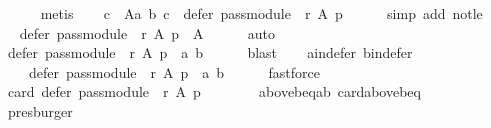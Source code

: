 \begin{isabellebody}
\ \ \ \ \isamarkupfalse%
\ metis\isanewline
\ \ \isamarkupfalse%
\ {\isachardoublequoteopen}{\isasymforall}c\ {\isasymin}\ A{\isacharminus}{\kern0pt}{\isacharbraceleft}{\kern0pt}a{\isacharcomma}{\kern0pt}\ b{\isacharbraceright}{\kern0pt}{\isachardot}{\kern0pt}\ c\ {\isasymnotin}\ defer\ {\isacharparenleft}{\kern0pt}pass{\isacharunderscore}{\kern0pt}module\ {}\ r{\isacharparenright}{\kern0pt}\ A\ p{\isachardoublequoteclose}\isanewline
\ \ \ \ \isamarkupfalse%
\ {\isacharparenleft}{\kern0pt}simp\ add{\isacharcolon}{\kern0pt}\ not{\isacharunderscore}{\kern0pt}le{\isacharparenright}{\kern0pt}\isanewline
\ \ \isamarkupfalse%
\ \isamarkupfalse%
\ {\isachardoublequoteopen}defer\ {\isacharparenleft}{\kern0pt}pass{\isacharunderscore}{\kern0pt}module\ {}\ r{\isacharparenright}{\kern0pt}\ A\ p\ {\isasymsubseteq}\ A{\isachardoublequoteclose}\isanewline
\ \ \ \ \isamarkupfalse%
\ auto\isanewline
\ \ \isamarkupfalse%
\ \isamarkupfalse%
\ {\isachardoublequoteopen}defer\ {\isacharparenleft}{\kern0pt}pass{\isacharunderscore}{\kern0pt}module\ {}\ r{\isacharparenright}{\kern0pt}\ A\ p\ {\isasymsubseteq}\ {\isacharbraceleft}{\kern0pt}a{\isacharcomma}{\kern0pt}\ b{\isacharbraceright}{\kern0pt}{\isachardoublequoteclose}\isanewline
\ \ \ \ \isamarkupfalse%
\ blast\isanewline
\ \ \isamarkupfalse%
\ a{\isacharunderscore}{\kern0pt}in{\isacharunderscore}{\kern0pt}defer\ b{\isacharunderscore}{\kern0pt}in{\isacharunderscore}{\kern0pt}defer\ \isamarkupfalse%
\isanewline
\ \ \ \ {\isachardoublequoteopen}defer\ {\isacharparenleft}{\kern0pt}pass{\isacharunderscore}{\kern0pt}module\ {}\ r{\isacharparenright}{\kern0pt}\ A\ p\ {\isacharequal}{\kern0pt}\ {\isacharbraceleft}{\kern0pt}a{\isacharcomma}{\kern0pt}\ b{\isacharbraceright}{\kern0pt}{\isachardoublequoteclose}\isanewline
\ \ \ \ \isamarkupfalse%
\ fastforce\isanewline
\ \ \isamarkupfalse%
\ {\isachardoublequoteopen}card\ {\isacharparenleft}{\kern0pt}defer\ {\isacharparenleft}{\kern0pt}pass{\isacharunderscore}{\kern0pt}module\ {}\ r{\isacharparenright}{\kern0pt}\ A\ p{\isacharparenright}{\kern0pt}\ {\isacharequal}{\kern0pt}\ {}{\isachardoublequoteclose}\isanewline
\ \ \ \ \isamarkupfalse%
\ above{\isacharunderscore}{\kern0pt}b{\isacharunderscore}{\kern0pt}eq{\isacharunderscore}{\kern0pt}ab\ card{\isacharunderscore}{\kern0pt}above{\isacharunderscore}{\kern0pt}b{\isacharunderscore}{\kern0pt}eq{\isacharunderscore}{\kern0pt}{}\isanewline
\ \ \ \ \isamarkupfalse%
\ presburger\isanewline
{}\isamarkupfalse%
%
\endisatagproof
{\isafoldproof}%
%
\isadelimproof
\isanewline
%
\endisadelimproof
%
\isadelimtheory
\isanewline
%
\endisadelimtheory
%
\isatagtheory
{}\isamarkupfalse%
%
\endisatagtheory
{\isafoldtheory}%
%
\isadelimtheory
%
\endisadelimtheory
%
\end{isabellebody}%
